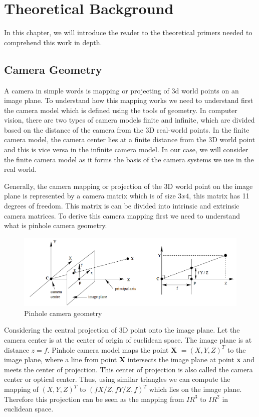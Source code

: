 

    \chapter{Theoretical Background}
    In this chapter, we will introduce the reader to the theoretical primers needed to comprehend this work in depth. 

    \section{Camera Geometry}
    A camera in simple words is mapping or projecting of 3d world points on an image plane. To understand how this mapping works we need to understand first the camera model which is defined using the tools of geometry. In computer vision, there are two types of camera models finite and infinite, which are divided based on the distance of the camera from the 3D real-world points. In the finite camera model, the camera center lies at a finite distance from the 3D world point and this is vice versa in the infinite camera model. In our case, we will consider the finite camera model as it forms the basis of the camera systems we use in the real world. 
    
    Generally, the camera mapping or projection of the 3D world point on the image plane is represented by a camera matrix which is of size $3x4$, this matrix has 11 degrees of freedom. This matrix is can be divided into intrinsic and extrinsic camera matrices. To derive this camera mapping first we need to understand what is pinhole camera geometry. 
    
     \begin{figure}[h]
    \centering
    \includegraphics[width=\textwidth]{images/pinhole_camera.png}
    \caption{Pinhole camera geometry \cite{10.5555/861369}}
    \end{figure}
    
    Considering the central projection of 3D point  onto the image plane. Let the camera center is at the center of origin of euclidean space. The image plane is at distance $z = f$. Pinhole camera model maps the point  \textbf{X} $ = (X, Y, Z)^{T}$ to the image plane, where a line from point \textbf{X} intersects the image plane at point \textbf{x} and meets the center of projection. This center of projection is also called the camera center or optical center. Thus, using similar triangles we can compute the mapping of $ (X, Y, Z)^{T}$ to $(fX/Z, fY/Z, f)^{T}$ which lies on the image plane. Therefore this projection can be seen as the mapping from $IR^{3}$ to $IR^{2}$ in euclidean space.  
    
